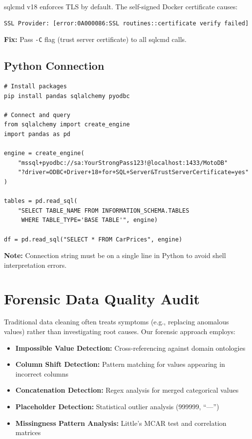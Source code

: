 \documentclass[12pt,a4paper]{article}
\begin{document}
sqlcmd v18 enforces TLS by default. The self-signed Docker certificate causes:

\begin{verbatim}
SSL Provider: [error:0A000086:SSL routines::certificate verify failed]
\end{verbatim}

\textbf{Fix:} Pass \texttt{-C} flag (trust server certificate) to all sqlcmd calls.

\subsection{Python Connection}

\begin{lstlisting}
# Install packages
pip install pandas sqlalchemy pyodbc

# Connect and query
from sqlalchemy import create_engine
import pandas as pd

engine = create_engine(
    "mssql+pyodbc://sa:YourStrongPass123!@localhost:1433/MotoDB"
    "?driver=ODBC+Driver+18+for+SQL+Server&TrustServerCertificate=yes"
)

tables = pd.read_sql(
    "SELECT TABLE_NAME FROM INFORMATION_SCHEMA.TABLES 
     WHERE TABLE_TYPE='BASE TABLE'", engine)

df = pd.read_sql("SELECT * FROM CarPrices", engine)
\end{lstlisting}

\textbf{Note:} Connection string must be on a single line in Python to avoid shell interpretation errors.

\section{Forensic Data Quality Audit}

\begin{methodbox}
Traditional data cleaning often treats symptoms (e.g., replacing anomalous values) rather than investigating root causes. Our forensic approach employs:
\begin{itemize}
    \item \textbf{Impossible Value Detection:} Cross-referencing against domain ontologies
    \item \textbf{Column Shift Detection:} Pattern matching for values appearing in incorrect columns
    \item \textbf{Concatenation Detection:} Regex analysis for merged categorical values
    \item \textbf{Placeholder Detection:} Statistical outlier analysis (999999, ``---'')
    \item \textbf{Missingness Pattern Analysis:} Little's MCAR test and correlation matrices
\end{itemize}
\end{methodbox}
\end{document}
